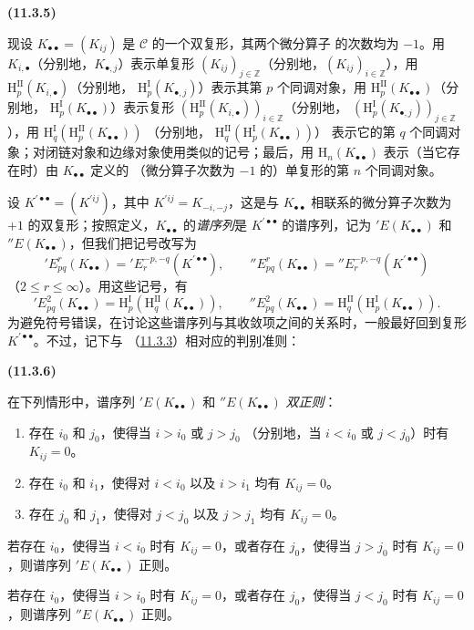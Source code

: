 \documentclass[UTF8,fontset=none,11pt,oneside,openany]{ctexbook}
\newenvironment{env}[1][]{%
  \par\medskip\noindent\textbf{(#1)}\ %
}{\par}
\newcommand{\oldpage}[2][]{%
  \hypertarget{ega-source-page-#1-#2}{}%
  \marginnote{\scriptsize\textbf{#1}~|~#2}\ignorespaces}
\let\EGAOriginalLabel\label
\renewcommand{\label}[1]{\phantomsection\EGAOriginalLabel{#1}}
\begin{document}
\begin{env}[11.3.5]
\label{0.11.3.5-fr}
现设 $K_{\bullet\bullet}=(K_{ij})$ 是 $\mathcal C$ 的一个双复形，其两个微分算子
的次数均为 $-1$。用 $K_{i,\bullet}$（分别地，$K_{\bullet,j}$）表示单复形
$(K_{ij})_{j\in\mathbb Z}$（分别地，$(K_{ij})_{i\in\mathbb Z}$），用
$\mathrm H_p^{\mathrm{II}}(K_{i,\bullet})$（分别地，
$\mathrm H_p^{\mathrm I}(K_{\bullet,j})$）表示其第 $p$ 个同调对象，用
$\mathrm H_p^{\mathrm{II}}(K_{\bullet\bullet})$（分别地，
$\mathrm H_p^{\mathrm I}(K_{\bullet\bullet})$）表示复形
$(\mathrm H_p^{\mathrm{II}}(K_{i,\bullet}))_{i\in\mathbb Z}$（分别地，
$(\mathrm H_p^{\mathrm I}(K_{\bullet,j}))_{j\in\mathbb Z}$），用
$\mathrm H_q^{\mathrm I}(\mathrm H_p^{\mathrm{II}}(K_{\bullet\bullet}))$
（分别地，
$\mathrm H_q^{\mathrm{II}}(\mathrm H_p^{\mathrm I}(K_{\bullet\bullet}))$）
表示它的第 $q$ 个同调对象；对闭链对象和边缘对象使用类似的记号；最后，用
$\mathrm H_n(K_{\bullet\bullet})$ 表示（当它存在时）由 $K_{\bullet\bullet}$ 定义的
（微分算子次数为 $-1$ 的）单复形的第 $n$ 个同调对象。

设 $K^{\prime\bullet\bullet}=(K^{\prime ij})$，其中
$K^{\prime ij}=K_{-i,-j}$，这是与 $K_{\bullet\bullet}$ 相联系的微分算子次数为
$+1$ 的双复形；按照定义，$K_{\bullet\bullet}$ 的\emph{谱序列}是
$K^{\prime\bullet\bullet}$ 的谱序列，记为 $'E(K_{\bullet\bullet})$ 和
$''E(K_{\bullet\bullet})$，但我们把记号改写为
\[
  'E_{pq}^r(K_{\bullet\bullet})
  ='E_r^{-p,-q}(K^{\prime\bullet\bullet}),\qquad
  ''E_{pq}^r(K_{\bullet\bullet})
  =''E_r^{-p,-q}(K^{\prime\bullet\bullet})
\]
（$2\leq r\leq\infty$）。用这些记号，有
\[
  'E_{pq}^2(K_{\bullet\bullet})
  =\mathrm H_p^{\mathrm I}(\mathrm H_q^{\mathrm{II}}(K_{\bullet\bullet})),
  \qquad
  ''E_{pq}^2(K_{\bullet\bullet})
  =\mathrm H_q^{\mathrm{II}}(\mathrm H_p^{\mathrm I}(K_{\bullet\bullet})).
\]
为避免符号错误，在讨论这些谱序列与其收敛项之间的关系时，一般最好回到复形
$K^{\prime\bullet\bullet}$。不过，记下与
（\hyperref[0.11.3.3-fr]{11.3.3}）相对应的判别准则：
\end{env}

\begin{env}[11.3.6]
\label{0.11.3.6-fr}
在下列情形中，谱序列 $'E(K_{\bullet\bullet})$ 和
$''E(K_{\bullet\bullet})$ \emph{双正则}：
\begin{enumerate}
  \item[(a)] 存在 $i_0$ 和 $j_0$，使得当 $i>i_0$ 或 $j>j_0$
    （分别地，当 $i<i_0$
    \oldpage[0\textsubscript{III}]{32}
    或 $j<j_0$）时有 $K_{ij}=0$。
  \item[(b)] 存在 $i_0$ 和 $i_1$，使得对 $i<i_0$ 以及 $i>i_1$ 均有
    $K_{ij}=0$。
  \item[(c)] 存在 $j_0$ 和 $j_1$，使得对 $j<j_0$ 以及 $j>j_1$ 均有
    $K_{ij}=0$。
\end{enumerate}

若存在 $i_0$，使得当 $i<i_0$ 时有 $K_{ij}=0$，或者存在 $j_0$，使得当
$j>j_0$ 时有 $K_{ij}=0$，则谱序列 $'E(K_{\bullet\bullet})$ 正则。

若存在 $i_0$，使得当 $i>i_0$ 时有 $K_{ij}=0$，或者存在 $j_0$，使得当
$j<j_0$ 时有 $K_{ij}=0$，则谱序列 $''E(K_{\bullet\bullet})$ 正则。
\end{env}
\end{document}

